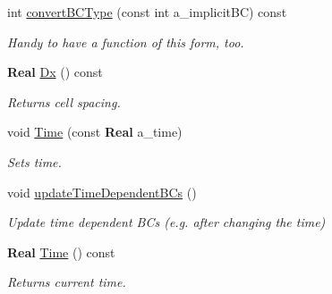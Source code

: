 \begin{DoxyCompactItemize}
\mbox{\label{class_phys_b_c_util_a4b2f350f7ed6b6d8dfa36c3b14fb4c83}} 
int \hyperlink{class_phys_b_c_util_a4b2f350f7ed6b6d8dfa36c3b14fb4c83}{convert\+B\+C\+Type} (const int a\+\_\+implicit\+BC) const
\begin{DoxyCompactList}\small\item\em Handy to have a function of this form, too. \end{DoxyCompactList}\item 
\mbox{\label{class_phys_b_c_util_a51eb3a218fa0e589a5108516f7cb4713}} 
\textbf{ Real} \hyperlink{class_phys_b_c_util_a51eb3a218fa0e589a5108516f7cb4713}{Dx} () const
\begin{DoxyCompactList}\small\item\em Returns cell spacing. \end{DoxyCompactList}\item 
\mbox{\label{class_phys_b_c_util_ab0e771887c439318b0501b9f67a1b8c2}} 
void \hyperlink{class_phys_b_c_util_ab0e771887c439318b0501b9f67a1b8c2}{Time} (const \textbf{ Real} a\+\_\+time)
\begin{DoxyCompactList}\small\item\em Sets time. \end{DoxyCompactList}\item 
\mbox{\label{class_phys_b_c_util_a0caf25dc5c31d42a6f41734c5d9feaff}} 
void \hyperlink{class_phys_b_c_util_a0caf25dc5c31d42a6f41734c5d9feaff}{update\+Time\+Dependent\+B\+Cs} ()
\begin{DoxyCompactList}\small\item\em Update time dependent B\+Cs (e.\+g. after changing the time) \end{DoxyCompactList}\item 
\mbox{\label{class_phys_b_c_util_a7b438a6bea59424a11f52958a5d17d9e}} 
\textbf{ Real} \hyperlink{class_phys_b_c_util_a7b438a6bea59424a11f52958a5d17d9e}{Time} () const
\begin{DoxyCompactList}\small\item\em Returns current time. \end{DoxyCompactList}\item 
\mbox{\label{class_phys_b_c_util_aacb13faac8c92afafe5ddc7d667e6181}} 

\end{DoxyCompactItemize}
